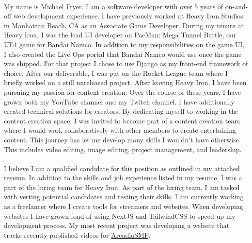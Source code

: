 \paragraph{}
My name is Michael Fryer. I am a software developer with over 5 years of on-and-off web development experience. I have previously worked at Heavy Iron Studios in Manhattan Beach, CA as an Associate Game Developer. During my tenure at Heavy Iron, I was the lead UI developer on PacMan: Mega Tunnel Battle, our UE4 game for Bandai Namco. In addition to my responsibilities on the game UI, I also created the Live Ops portal that Bandai Namco would use once the game was shipped. For that project I chose to use Django as my front-end framework of choice. After our deliverable, I was put on the Rocket League team where I briefly worked on a still unreleased project. After leaving Heavy Iron, I have been pursuing my passion for content creation. Over the course of these years, I have grown both my YouTube channel and my Twitch channel. I have additionally created technical solutions for creators. By dedicating myself to working in the content creation space, I was invited to become part of a content creation team where I would work collaboratively with other members to create entertaining content. This journey has let me develop many skills I wouldn't have otherwise. This includes video editing, image editing, project management, and leadership.

\paragraph{}
I believe I am a qualified candidate for this position as outlined in my attached resume. In addition to the skills and job experience listed in my resume, I was a part of the hiring team for Heavy Iron. As part of the hiring team, I am tasked with vetting potential candidates and testing their skills. I am currently working as a freelancer where I create tools for streamers and websites. When developing websites I have grown fond of using NextJS and TailwindCSS to speed up my development process. My most recent project was developing a website that tracks recently published videos for \href{https://arcadia.yt}{ArcadiaSMP}.